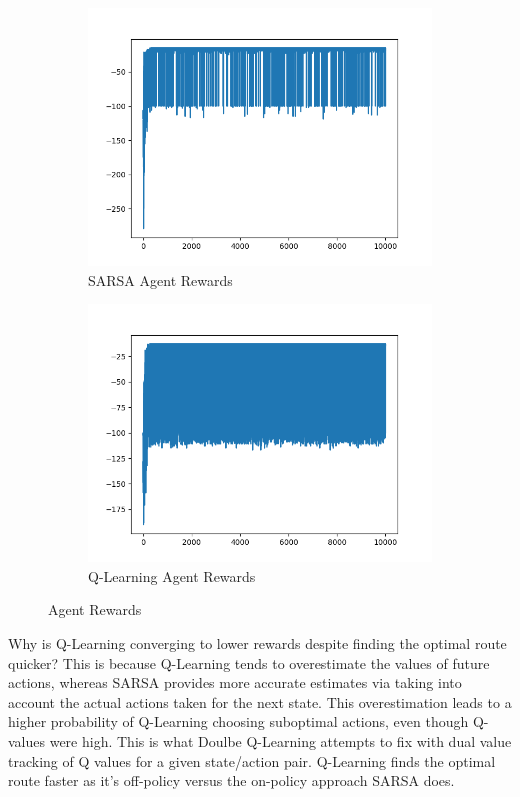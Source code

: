 \documentclass{article}
\begin{document}
\begin{figure}
    \begin{subfigure}{.5\textwidth}
        \centering
        \includegraphics[width=.8\linewidth]{imgs/sarsa_rewards.png}
        \caption{SARSA Agent Rewards}
    \end{subfigure}
    \begin{subfigure}{.5\textwidth}
        \centering
        \includegraphics[width=.8\linewidth]{imgs/q_learning_rewards.png}
        \caption{Q-Learning Agent Rewards}
    \end{subfigure}
    \caption{Agent Rewards}
\end{figure}

Why is Q-Learning converging to lower rewards despite finding the optimal route quicker? This is because Q-Learning tends to overestimate the values of future actions, whereas SARSA provides more accurate estimates via taking into account the actual actions taken for the next state. This overestimation leads to a higher probability of Q-Learning choosing suboptimal actions, even though Q-values were high. This is what Doulbe Q-Learning attempts to fix with dual value tracking of Q values for a given state/action pair. Q-Learning finds the optimal route faster as it's off-policy versus the on-policy approach SARSA does.
\end{document}

